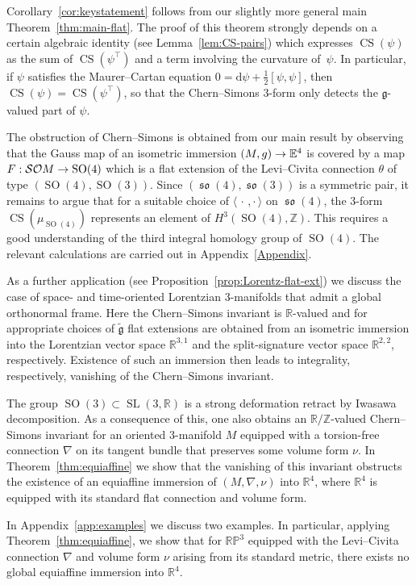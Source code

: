 \documentclass[AHL,Unicode,longabstracts]{cedram}
\newcommand{\B}[2]{\langle#1,#2\rangle}
\DeclareMathOperator{\CS}{CS}
\DeclareMathOperator{\SO}{SO}
\DeclareMathOperator{\SL}{SL}
\DeclareMathOperator{\fkso}{\mathfrak{so}}
\renewcommand*{\d}{\mathrm{d}}
\newcommand*{\R}{\mathbb{R}}
\newcommand*{\bbRP}{\mathbb{RP}}
\newcommand*{\bbE}{\mathbb{E}}
\newcommand{\Z}{\mathbb{Z}}
\newcommand{\tfg}{\widetilde{\mathfrak g}}
\newcommand{\fkg}{\mathfrak{g}}
\newcommand{\clSO}{\mathcal{SO}}
\renewcommand*{\to}{\mathchoice{\longrightarrow}{\rightarrow}{\rightarrow}{\rightarrow}}
\newcommand*{\R}{\mathbb{R}}
\begin{document}
Corollary~\ref{cor:keystatement} follows from our slightly more general main Theorem~\ref{thm:main-flat}. The proof of this theorem strongly depends on a certain algebraic identity (see Lemma~\ref{lem:CS-pairs}) which expresses $\CS(\psi)$ as the sum of $\CS(\psi^{\top})$ and a term involving the curvature of~$\psi$. In particular, if $\psi$ satisfies the Maurer--Cartan equation $0=\d\psi+\frac{1}{2}[\psi,\psi]$, then $\CS(\psi)=\CS(\psi^{\top})$, so that the Chern--Simons $3$-form only detects the $\fkg$-valued part of $\psi$.

The obstruction of Chern--Simons is obtained from our main result by observing that the Gauss map of an isometric immersion $(M,g) \to
\bbE^4$ is covered by a map $F : \clSO M \to \SO(4)$ which is a flat extension of the Levi--Civita connection $\theta$ of type $(\SO(4),\SO(3))$. Since $(\fkso(4),\fkso(3))$ is a symmetric pair, it remains to argue that for\pagebreak{} a suitable choice of $\B{\,\cdot\,}{\cdot\,}$ on $\fkso(4)$, the $3$-form $\CS(\mu_{\SO(4)})$ represents an element of $H^3(\SO(4),\Z)$. This requires a good understanding of the third integral homology group of $\SO(4)$. The relevant calculations are carried out in Appendix~\ref{Appendix}.

As a further application (see Proposition~\ref{prop:Lorentz-flat-ext}) we discuss the case of space- and time-oriented Lorentzian $3$-manifolds that admit a global orthonormal frame. Here the Chern--Simons invariant is $\R$-valued and for appropriate choices of $\tfg$ flat extensions are obtained from an isometric immersion into the Lorentzian vector space $\R^{3,1}$ and the split-signature vector space $\R^{2,2}$, respectively. Existence of such an immersion then leads to integrality, respectively, vanishing of the Chern--Simons invariant.

The group $\SO(3)\subset \SL(3,\R)$ is a strong deformation retract by Iwasawa decomposition. As a consequence of this, one also obtains an $\R/\Z$-valued Chern--Simons invariant for an oriented $3$-manifold $M$ equipped with a torsion-free connection $\nabla$ on its tangent bundle that preserves some volume form $\nu$. In Theorem~\ref{thm:equiaffine} we show that the vanishing of this invariant obstructs the existence of an equiaffine immersion of $(M,\nabla,\nu)$ into $\R^4$, where $\R^4$ is equipped with its standard flat connection and volume form.

In Appendix~\ref{app:examples} we discuss two examples. In particular, applying Theorem~\ref{thm:equiaffine}, we show that for $\bbRP^3$ equipped with the Levi--Civita connection $\nabla$ and volume form $\nu$ arising from its standard metric, there exists no global equiaffine immersion into $\R^4$.
\end{document}
